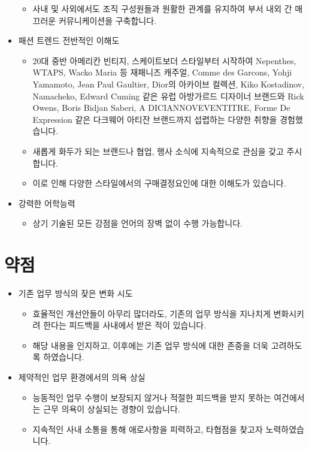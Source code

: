 \documentclass[a4paper,10pt]{extarticle}
\begin{document}
\begin{itemize}
	      \begin{itemize}
		      \item 사내 및 사외에서도 조직 구성원들과 원활한 관계를 유지하여 부서 내외 간 매끄러운 커뮤니케이션을 구축합니다.
	      \end{itemize}
	\item 패션 트렌드 전반적인 이해도
	      \begin{itemize}
		      \item 20대 중반 아메리칸 빈티지, 스케이트보더 스타일부터 시작하여 Nepenthes, WTAPS, Wacko Maria 등 재패니즈 캐주얼, Comme des Garcons, Yohji Yamamoto, Jean Paul Gaultier, Dior의 아카이브 컬렉션, Kiko Kostadinov, Namacheko, Edward Cuming 같은 유럽 아방가르드 디자이너 브랜드와 Rick Owens, Boris Bidjan Saberi, A DICIANNOVEVENTITRE, Forme De Expression 같은 다크웨어 아티잔 브랜드까지 섭렵하는 다양한 취향을 경험했습니다.
		      \item 새롭게 화두가 되는 브랜드나 협업, 행사 소식에 지속적으로 관심을 갖고 주시합니다.
		      \item 이로 인해 다양한 스타일에서의 구매결정요인에 대한 이해도가 있습니다.
	      \end{itemize}
	\item 강력한 어학능력
	      \begin{itemize}
		      \item 상기 기술된 모든 강점을 언어의 장벽 없이 수행 가능합니다.
	      \end{itemize}
\end{itemize}

\section*{약점}
\begin{itemize}
	\item 기존 업무 방식의 잦은 변화 시도
	      \begin{itemize}
		      \item 효율적인 개선안들이 아무리 많더라도, 기존의 업무 방식을 지나치게 변화시키려 한다는 피드백을 사내에서 받은 적이 있습니다.
		      \item 해당 내용을 인지하고, 이후에는 기존 업무 방식에 대한 존중을 더욱 고려하도록 하였습니다.
	      \end{itemize}
\end{itemize}
\begin{itemize}
	\item 제약적인 업무 환경에서의 의욕 상실
	      \begin{itemize}
		      \item 능동적인 업무 수행이 보장되지 않거나 적절한 피드백을 받지 못하는 여건에서는 근무 의욕이 상실되는 경향이 있습니다.
		      \item 지속적인 사내 소통을 통해 애로사항을 피력하고, 타협점을 찾고자 노력하였습니다.
	      \end{itemize}
\end{itemize}
\end{document}
